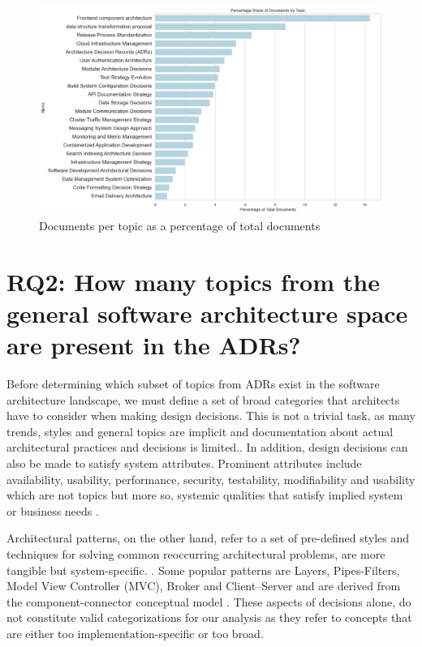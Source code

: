         \begin{figure}[H]
            \hspace*{-3cm} 
            \includegraphics[scale=0.55]{figures/percentage_topics.png}
            \caption{Documents per topic as a percentage of total documents}
            \label{fig:docs_per_topic_percentage}
        \end{figure}


    \section{RQ2: How many topics from the general software architecture space are present in the ADRs?}

        Before determining which subset of topics from ADRs exist in the software architecture landscape, we must define a set of broad categories that architects have to consider when making design decisions. This is not a trivial task, as many trends, styles and general topics are implicit and documentation about actual architectural practices and decisions is limited.\cite{arch_patterns_in_practice_TOPICS}. In addition, design decisions can also be made to satisfy system attributes. Prominent attributes include availability, usability, performance, security, testability, modifiability and usability which are not topics but more so, systemic qualities that satisfy implied system or business needs \cite{patters+quality_requirements+tactics}.
        
        Architectural patterns, on the other hand, refer to a set of pre-defined styles and techniques for solving common reoccurring architectural problems, are more tangible but system-specific. \cite{Patterns+ArchDecisions}. Some popular patterns are Layers, Pipes-Filters, Model View Controller (MVC), Broker and Client–Server and are derived from the component-connector conceptual model \cite{survey_arch_patterns}. These aspects of decisions alone, do not constitute valid categorizations for our analysis as they refer to concepts that are either too implementation-specific or too broad. 
        

